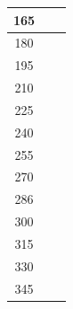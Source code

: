 \documentclass[twocolumn,a4j]{jsarticle}
\begin{document}
\begin{table}[htbp]
\begin{center}
\begin{tabular}{|p{20mm}|p{20mm}|p{20mm}|}
            \multicolumn{1}{|c|}{165}                  & \multicolumn{1}{|r|}{}                     & \multicolumn{1}{|r|}{\textgt{}}            \\ \hline
            \multicolumn{1}{|c|}{180}                  & \multicolumn{1}{|r|}{}                     & \multicolumn{1}{|r|}{\textgt{}}            \\ \hline
            \multicolumn{1}{|c|}{195}                  & \multicolumn{1}{|r|}{}                     & \multicolumn{1}{|r|}{\textgt{}}            \\ \hline
            \multicolumn{1}{|c|}{210}                  & \multicolumn{1}{|r|}{}                     & \multicolumn{1}{|r|}{\textgt{}}            \\ \hline
            \multicolumn{1}{|c|}{225}                  & \multicolumn{1}{|r|}{}                     & \multicolumn{1}{|r|}{\textgt{}}            \\ \hline
            \multicolumn{1}{|c|}{240}                  & \multicolumn{1}{|r|}{}                     & \multicolumn{1}{|r|}{\textgt{}}            \\ \hline
            \multicolumn{1}{|c|}{255}                  & \multicolumn{1}{|r|}{}                     & \multicolumn{1}{|r|}{\textgt{}}            \\ \hline
            \multicolumn{1}{|c|}{270}                  & \multicolumn{1}{|r|}{}                     & \multicolumn{1}{|r|}{\textgt{}}            \\ \hline
            \multicolumn{1}{|c|}{286}                  & \multicolumn{1}{|r|}{}                     & \multicolumn{1}{|r|}{\textgt{}}            \\ \hline
            \multicolumn{1}{|c|}{300}                  & \multicolumn{1}{|r|}{}                     & \multicolumn{1}{|r|}{\textgt{}}            \\ \hline
            \multicolumn{1}{|c|}{315}                  & \multicolumn{1}{|r|}{}                     & \multicolumn{1}{|r|}{\textgt{}}            \\ \hline
            \multicolumn{1}{|c|}{330}                  & \multicolumn{1}{|r|}{}                     & \multicolumn{1}{|r|}{\textgt{}}            \\ \hline
            \multicolumn{1}{|c|}{345}                  & \multicolumn{1}{|r|}{}                     & \multicolumn{1}{|r|}{\textgt{}}            \\ \hline
        \end{tabular}
    \end{center}
\end{table}
\end{document}
